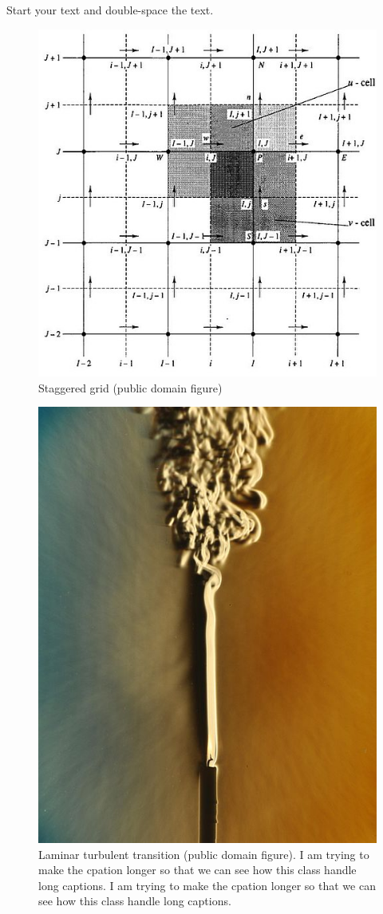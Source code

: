\documentclass[debug, font=Times]{gw-dissertation}[2021/11/19]
\begin{document}
Start your text and double-space the text.
\begin{figure}[h!]
    \Centering
    \includegraphics[width=0.5\linewidth]{grid.jpg}
    \caption{Staggered grid (public domain figure)}
\end{figure}
\begin{figure}[h!]
    \includegraphics{laminar_turbulent_transition.jpg}
    \caption{%
        Laminar turbulent transition (public domain figure). I am trying to make the cpation%
        longer so that we can see how this class handle long captions. I am trying to make the %
        cpation longer so that we can see how this class handle long captions.%
    }
\end{figure}
\end{document}
